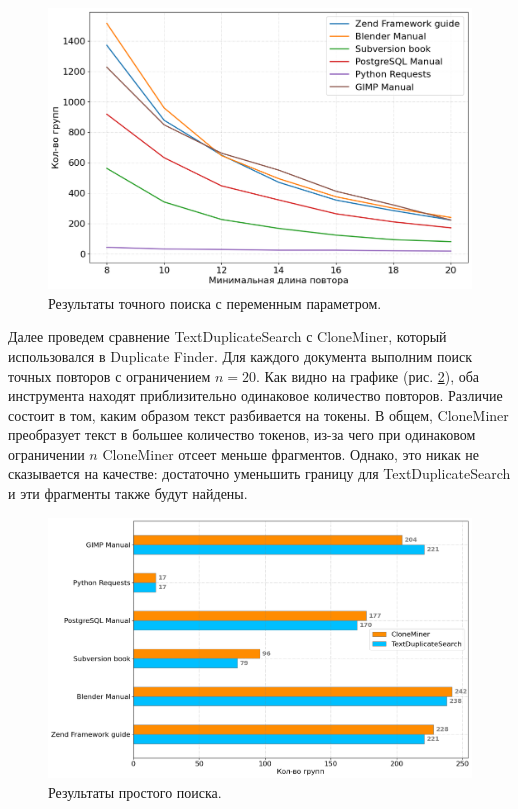 \documentclass[14pt]{matmex-diploma-custom}
\begin{document}
\begin{figure}[ht!]
	\centering
	\includegraphics[scale=0.55]{pictures/StrictSearch.png}
	\caption{Результаты точного поиска с переменным параметром.}
	\label{fig:StrictSearch}
\end{figure}

Далее проведем сравнение TextDuplicateSearch с CloneMiner, который использовался в Duplicate Finder. Для каждого документа выполним поиск точных повторов с ограничением $n=20$. Как видно на графике (рис. \ref{fig:Comp1}), оба инструмента находят приблизительно одинаковое количество повторов. Различие состоит в том, каким образом текст разбивается на токены. В общем, CloneMiner преобразует текст в большее количество токенов, из-за чего при одинаковом ограничении $n$ CloneMiner отсеет меньше фрагментов. Однако, это никак не сказывается на качестве: достаточно уменьшить границу для TextDuplicateSearch и эти фрагменты также будут найдены.

\begin{figure}[ht!]
	\centering
	\includegraphics[scale=0.47]{pictures/Comp1.png}
	\caption{Результаты простого поиска.}
	\label{fig:Comp1}
\end{figure}
\end{document}
